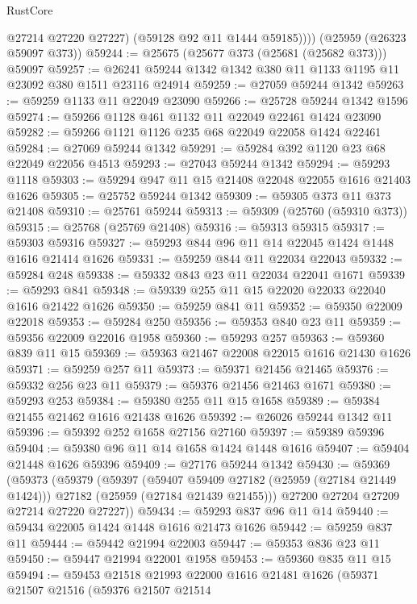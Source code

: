 \begin{lexlean}{RustCore}
\begin{coremodule}
            @27214
            @27220
            @27227)
          (@59128 @92 @11 @1444 @59185))))
    (@25959 (@26323 @59097 @373))
@59244 := @25675 (@25677 @373 (@25681 (@25682 @373))) @59097
@59257 := @26241 @59244 @1342 @1342 @380 @11 @1133 @1195 @11 @23092 @380 @1511 @23116 @24914
@59259 := @27059 @59244 @1342
@59263 := @59259 @1133 @11 @22049 @23090
@59266 := @25728 @59244 @1342 @1596
@59274 := @59266 @1128 @461 @1132 @11 @22049 @22461 @1424 @23090
@59282 := @59266 @1121 @1126 @235 @68 @22049 @22058 @1424 @22461
@59284 := @27069 @59244 @1342
@59291 := @59284 @392 @1120 @23 @68 @22049 @22056 @4513
@59293 := @27043 @59244 @1342
@59294 := @59293 @1118
@59303 := @59294 @947 @11 @15 @21408 @22048 @22055 @1616 @21403 @1626
@59305 := @25752 @59244 @1342
@59309 := @59305 @373 @11 @373 @21408
@59310 := @25761 @59244
@59313 := @59309 (@25760 (@59310 @373))
@59315 := @25768 (@25769 @21408)
@59316 := @59313 @59315
@59317 := @59303 @59316
@59327 := @59293 @844 @96 @11 @14 @22045 @1424 @1448 @1616 @21414 @1626
@59331 := @59259 @844 @11 @22034 @22043
@59332 := @59284 @248
@59338 := @59332 @843 @23 @11 @22034 @22041 @1671
@59339 := @59293 @841
@59348 := @59339 @255 @11 @15 @22020 @22033 @22040 @1616 @21422 @1626
@59350 := @59259 @841 @11
@59352 := @59350 @22009 @22018
@59353 := @59284 @250
@59356 := @59353 @840 @23 @11
@59359 := @59356 @22009 @22016 @1958
@59360 := @59293 @257
@59363 := @59360 @839 @11 @15
@59369 := @59363 @21467 @22008 @22015 @1616 @21430 @1626
@59371 := @59259 @257 @11
@59373 := @59371 @21456 @21465
@59376 := @59332 @256 @23 @11
@59379 := @59376 @21456 @21463 @1671
@59380 := @59293 @253
@59384 := @59380 @255 @11 @15 @1658
@59389 := @59384 @21455 @21462 @1616 @21438 @1626
@59392 := @26026 @59244 @1342 @11
@59396 := @59392 @252 @1658 @27156 @27160
@59397 := @59389 @59396
@59404 := @59380 @96 @11 @14 @1658 @1424 @1448 @1616
@59407 := @59404 @21448 @1626 @59396
@59409 := @27176 @59244 @1342
@59430 := @59369
    (@59373
      (@59379
        (@59397
          (@59407 @59409 @27182 (@25959 (@27184 @21449 @1424)))
          @27182
          (@25959 (@27184 @21439 @21455)))
        @27200
        @27204
        @27209
        @27214
        @27220
        @27227))
@59434 := @59293 @837 @96 @11 @14
@59440 := @59434 @22005 @1424 @1448 @1616 @21473 @1626
@59442 := @59259 @837 @11
@59444 := @59442 @21994 @22003
@59447 := @59353 @836 @23 @11
@59450 := @59447 @21994 @22001 @1958
@59453 := @59360 @835 @11 @15
@59494 := @59453
    @21518
    @21993
    @22000
    @1616
    @21481
    @1626
    (@59371
      @21507
      @21516
      (@59376
        @21507
        @21514

\end{coremodule}
\end{lexlean}
